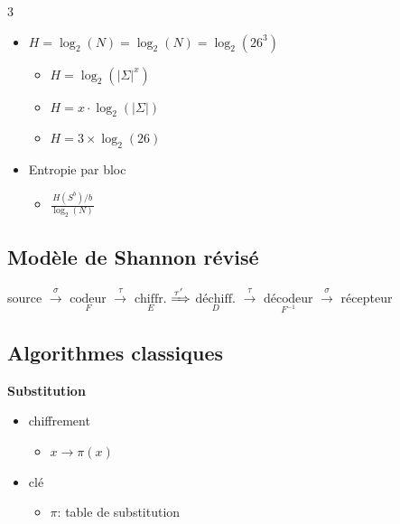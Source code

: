 \documentclass[9pt, a4paper, twoside]{article}
\begin{document}
\begin{multicols}{3}
\begin{itemize}[leftmargin=0.0em,label={}]
    \item \scriptsize $H = \log_{2}(N) = \log_{2}(N) = \log_{2}(26^{3})$
    \begin{itemize}[label={}]
        \item \scriptsize $H = \log_{2}(\lvert \Sigma \rvert^{x})$
        \item \scriptsize $H = x \cdot \log_{2}(\lvert \Sigma \rvert)$
        \item \scriptsize $H = 3 \times  \log_{2}(26)$
    \end{itemize}
    \item \scriptsize  Entropie par bloc
    \begin{itemize}[label={}]
        \item \scriptsize $\frac{H(S^{b})/b}{\log_{2}(N)}$
    \end{itemize}
\end{itemize}

\footnotesize \subsection{Modèle de Shannon révisé}

\begin{flushleft}
    \scriptsize source $\xrightarrow{\sigma}$ $\underset{F}{\text{codeur}}$ $\xrightarrow{\tau}$ $\underset{E}{\text{chiffr.}}$ $\xRightarrow{\tau^{\prime}}$ $\underset{D}{\text{déchiff.}}$ $\xrightarrow{\tau}$ $\underset{F^{-1}}{\text{décodeur}}$ $\xrightarrow{\sigma}$ récepteur
\end{flushleft}

\footnotesize \subsection{Algorithmes classiques}


\begin{flushleft}
    \scriptsize \textbf{Substitution}
\end{flushleft}

\begin{itemize}[label=$\bullet$]
    \item \scriptsize chiffrement
    \begin{itemize}[label={}]
        \item \scriptsize $x \rightarrow \pi(x)$
    \end{itemize}
    \item \scriptsize clé
    \begin{itemize}[label={}]
        \item \scriptsize $\pi$: table de substitution
    \end{itemize}
\end{itemize}


\end{multicols}
\end{document}
